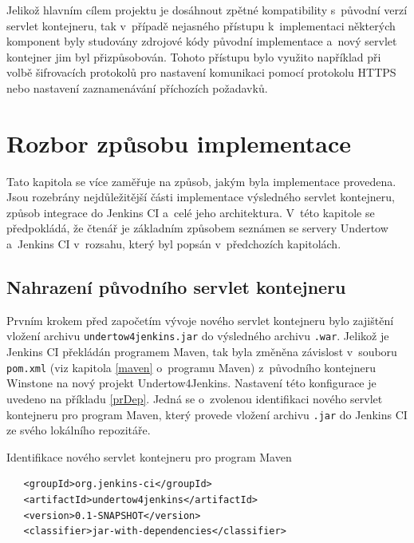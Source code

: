         \medskip
        Jelikož hlavním cílem projektu je dosáhnout zpětné kompatibility s~původní verzí servlet kontejneru,
        tak v~případě nejasného přístupu k~implementaci některých komponent byly studovány zdrojové kódy
        původní implementace a~nový servlet kontejner jim byl přizpůsobován. Tohoto přístupu bylo využito
        například při volbě šifrovacích protokolů pro nastavení komunikaci pomocí protokolu HTTPS nebo nastavení zaznamenávání
        příchozích požadavků.
        
     \section{Rozbor způsobu implementace}
        Tato kapitola se více zaměřuje na způsob, jakým byla implementace provedena. Jsou rozebrány nejdůležitější
        části implementace výsledného servlet kontejneru, způsob integrace do Jenkins CI
        a~celé jeho architektura. V~této kapitole se předpokládá, že čtenář je
        základním způsobem seznámen se servery Undertow a~Jenkins CI v~rozsahu, který byl popsán
        v~předchozích kapitolách.


        \subsection{Nahrazení původního servlet kontejneru}
            Prvním krokem před započetím vývoje nového servlet kontejneru bylo zajištění vložení archivu \texttt{undertow4jenkins.jar} 
            do výsledného archivu \texttt{.war}.
            Jelikož je Jenkins CI překládán programem Maven, tak byla změněna závislost v~souboru \texttt{pom.xml} 
            (viz kapitola \ref{maven} o~programu Maven)
            z~původního kontejneru Winstone na nový projekt Undertow4Jenkins.
            Nastavení této konfigurace je uvedeno na příkladu \ref{prDep}. Jedná se o~zvolenou identifikaci nového servlet
            kontejneru pro program Maven, který provede vložení archivu \texttt{.jar} do Jenkins CI ze svého lokálního repozitáře.

\begin{priklad} \label{prDep} Identifikace nového servlet kontejneru pro program Maven 
\begin{verbatim}
   <groupId>org.jenkins-ci</groupId>
   <artifactId>undertow4jenkins</artifactId>
   <version>0.1-SNAPSHOT</version>
   <classifier>jar-with-dependencies</classifier>
\end{verbatim}
\end{priklad}


